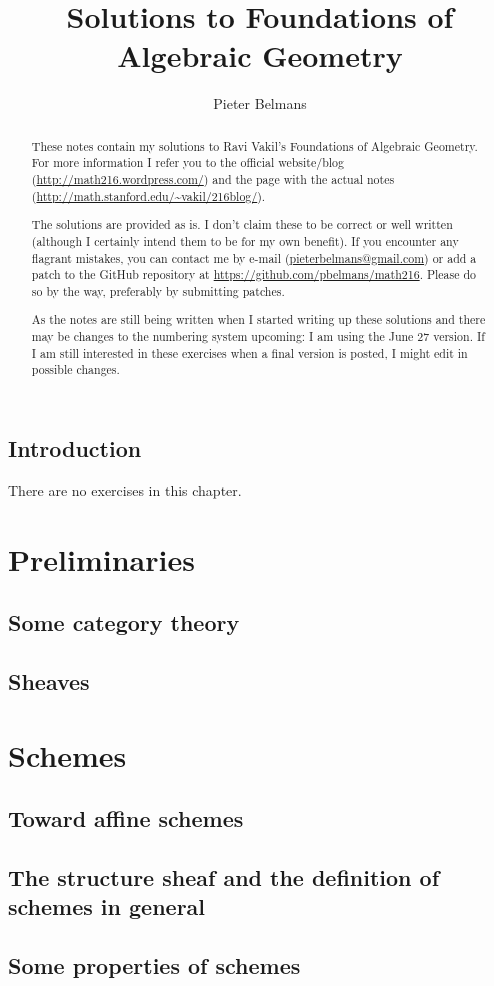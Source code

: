 \documentclass[oneside, openany]{memoir}
\title{Solutions to Foundations of Algebraic Geometry}
\author{Pieter Belmans}
\begin{document}
\maketitle

\begin{abstract}
  These notes contain my solutions to Ravi Vakil's Foundations of Algebraic Geometry. For more information I refer you to the official website/blog (\url{http://math216.wordpress.com/}) and the page with the actual notes (\url{http://math.stanford.edu/~vakil/216blog/}).
  
  The solutions are provided as is. I don't claim these to be correct or well written (although I certainly intend them to be for my own benefit). If you encounter any flagrant mistakes, you can contact me by e-mail (\url{pieterbelmans@gmail.com}) or add a patch to the GitHub repository at \url{https://github.com/pbelmans/math216}. Please do so by the way, preferably by submitting patches.

  As the notes are still being written when I started writing up these solutions and there may be changes to the numbering system upcoming: I am using the June 27 version. If I am still interested in these exercises when a final version is posted, I might edit in possible changes.
\end{abstract}

\clearpage

\tableofcontents*


\chapter{Introduction}
There are no exercises in this chapter.


\part{Preliminaries}

\chapter{Some category theory}


\chapter{Sheaves}



\part{Schemes}

\chapter{Toward affine schemes}


\chapter{The structure sheaf and the definition of schemes in general}


\chapter{Some properties of schemes}

\end{document}
